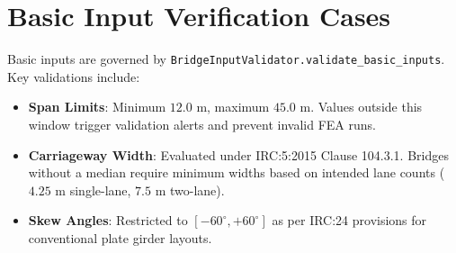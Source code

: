 \section{Basic Input Verification Cases}
Basic inputs are governed by \texttt{BridgeInputValidator.validate\_basic\_inputs}. Key validations include:
\begin{itemize}
    \item \textbf{Span Limits}: Minimum $12.0\text{ m}$, maximum $45.0\text{ m}$. Values outside this window trigger validation alerts and prevent invalid FEA runs.
    \item \textbf{Carriageway Width}: Evaluated under IRC:5:2015 Clause 104.3.1. Bridges without a median require minimum widths based on intended lane counts ($4.25\text{ m}$ single-lane, $7.5\text{ m}$ two-lane).
    \item \textbf{Skew Angles}: Restricted to $[-60^\circ, +60^\circ]$ as per IRC:24 provisions for conventional plate girder layouts.
\end{itemize}
